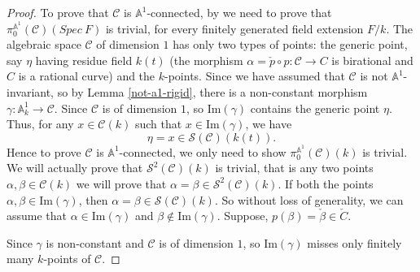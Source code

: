 \documentclass[11pt, reqno]{amsart}
\theoremstyle{plain}
\theoremstyle{definition}
\newcommand{\sC}{{\mathcal C}}
\newcommand{\sS}{{\mathcal S}}
\newcommand{\A}{{\mathbb A}}
\begin{document}
\begin{proof}
To prove that $\mathcal{C}$ is $\mathbb{A}^1$-connected, by \cite[Lemma 3.3.6]{ictp} we need to prove that $\pi_0^{\mathbb{A}^1}(\mathcal{C})(Spec \ F)$ is trivial, for every finitely generated field extension $F/k$. The algebraic space $\mathcal{C}$ of dimension $1$ has only two types of points: the generic point, say $\eta$ having residue field $k(t)$ (the morphism $\alpha = \check{p} \circ p: \sC \to C$ is birational and $C$ is a rational curve) and the $k$-points. Since we have assumed that $\sC$ is not $\A^1$-invariant, so by Lemma \ref{not-a1-rigid}, 
there is a non-constant morphism $\gamma: \mathbb{A}^1_k \to \mathcal{C}$. Since $\sC$ is of dimension $1$, so $\text{Im}(\gamma)$ contains the generic point $\eta$. Thus, for any $x \in \sC(k)$ such that $x \in \text{Im}(\gamma)$, we have 
$$\eta = x \in \sS(\sC)(k(t)).$$
Hence to prove $\sC$ is $\A^1$-connected, we only need to show $\pi_0^{\A^1}(\sC)(k)$ is trivial. We will actually prove that $\sS^2(\sC)(k)$ is trivial, that is any two points 
$\alpha,\beta\in\sC(k)$ we will prove that $\alpha =\beta\in\sS^2(\sC)(k)$. If both the points $\alpha, \beta \in \text{Im}(\gamma)$, then $\alpha = \beta \in \sS(\sC)(k)$. So without loss of generality, we can assume that $\alpha \in \mathrm{Im}(\gamma)$ and $\beta \notin \mathrm{Im}(\gamma)$. Suppose, $p(\beta) = \check{\beta} \in \check{C}$.

Since $\gamma$ is non-constant and $\sC$ is of dimension $1$, so $\text{Im}(\gamma)$ misses only finitely many $k$-points of $\sC$.





\end{proof}
\end{document}
